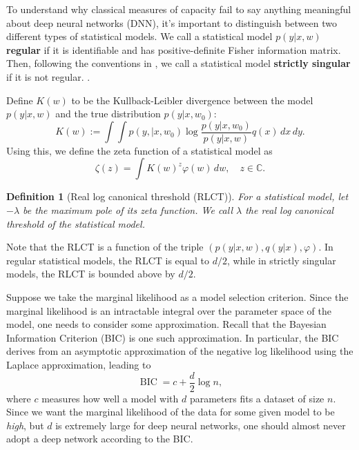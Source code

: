 \documentclass{article} %
\newtheorem{definition}{Definition}
\begin{document}
To understand why classical measures of capacity fail to say anything meaningful about deep neural networks (DNN), it's important to distinguish between two different types of statistical models. We call a statistical model $p(y|x,w)$ \textbf{regular} if it is identifiable and has positive-definite Fisher information matrix. Then, following the conventions in \cite{watanabe_algebraic_2009}, we call a statistical model \textbf{strictly singular} if it is not regular. 
 {\cite[Theorem 7.2]{watanabe_algebraic_2009}}.

Define $K(w)$ to be the Kullback-Leibler divergence between the model $p(y|x,w)$ and the true distribution $p(y|x,w_0)$:
\begin{equation}
    K(w) := \int \!\int p(y,|x,w_0) \log \frac{ p(y|x, w_0) }{ p(y|x,w) } q(x) \,dx \,dy.
\end{equation}
Using this, we define the zeta function of a statistical model as
\begin{equation}
    \zeta(z) = \int K(w)^z \varphi(w) \,dw, \quad z \in \mathbb C.
\end{equation}

\begin{definition}[Real log canonical threshold (RLCT)]
For a statistical model, let $-\lambda$ be the maximum pole of its zeta function. We call $\lambda$ the real log canonical threshold of the statistical model.
\label{def:RLCT}
\end{definition}

Note that the RLCT is a function of the triple $(p(y|x,w),q(y|x),\varphi)$. In regular statistical models, the RLCT is equal to $d/2$, while in strictly singular models, the RLCT is bounded above by $d/2$.



Suppose we take the marginal likelihood as a model selection criterion. Since the marginal likelihood is an intractable integral over the parameter space of the model, one needs to consider some approximation. Recall that the Bayesian Information Criterion (BIC) is one such approximation. In particular, the BIC derives from an asymptotic approximation of the negative log likelihood using the Laplace approximation, leading to
\[
\operatorname{BIC} = c + \frac{d}{2} \log n,
\]
where $c$ measures how well a model with $d$ parameters fits a dataset of size $n$. Since we want the marginal likelihood of the data for some given model to be \textit{high}, but $d$ is extremely large for deep neural networks, one should almost never adopt a deep network according to the BIC. 
\end{document}
